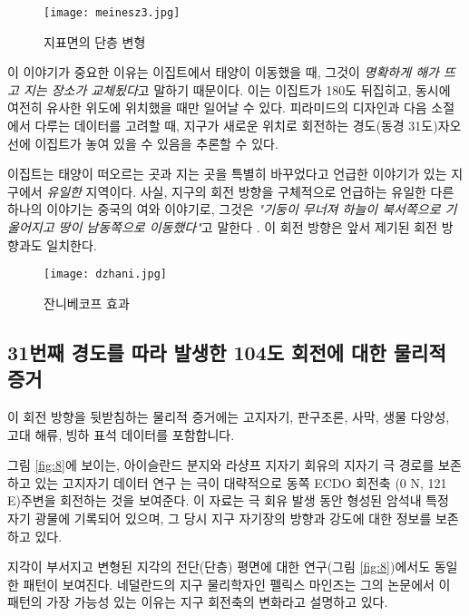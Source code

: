 \documentclass[10pt,twocolumn,letterpaper]{article}
\begin{document}
\begin{개요}
\begin{figure}[t]
\begin{center}
   \texttt{[image: meinesz3.jpg]}
\end{center}
   \caption{지표면의 단층 변형  \cite{36}}
\label{fig:8}
\label{fig:onecol}
\end{figure}


이 이야기가 중요한 이유는 이집트에서 태양이 이동했을 때, 그것이 \textit{ 명확하게 해가 뜨고 지는 장소가 교체됬다}고 말하기 때문이다. 이는 이집트가 180도 뒤집히고, 동시에 여전히 유사한 위도에 위치했을 때만 일어날 수 있다. 피라미드의 디자인과 다음 소절에서 다루는 데이터를 고려할 때, 지구가 새로운 위치로 회전하는 경도(동경 31도)자오선에 이집트가  놓여 있을 수 있음을 추론할 수 있다.

이집트는 태양이 떠오르는 곳과 지는 곳을 특별히 바꾸었다고 언급한 이야기가 있는 지구에서 \textit{유일한} 지역이다. 사실, 지구의 회전 방향을 구체적으로 언급하는 유일한 다른 하나의 이야기는 중국의 여와 이야기로, 그것은 \textit{"기둥이 무너져 하늘이 북서쪽으로 기울어지고 땅이 남동쪽으로 이동했다"}고 말한다 \cite{8}. 이 회전 방향은 앞서 제기된 회전 방향과도 일치한다.


\begin{figure*}[t]
\begin{center}
\texttt{[image: dzhani.jpg]}
\end{center}
   \caption{잔니베코프 효과  \cite{28}}
\label{fig:10}
\end{figure*}

\subsection{31번째 경도를 따라 발생한 104도 회전에 대한 물리적 증거}


이 회전 방향을 뒷받침하는 물리적 증거에는 고지자기, 판구조론, 사막, 생물 다양성, 고대 해류, 빙하 표석 데이터를 포함합니다.

그림 \ref{fig:8}에 보이는, 아이슬란드 분지와 라샹프 지자기 회유의 지자기 극 경로를 보존하고 있는 고지자기 데이터 연구 \cite{35}는 극이 대략적으로 동쪽 ECDO 회전축 (0 N, 121 E)주변을 회전하는 것을 보여준다. 이 자료는 극 회유 발생 동안 형성된 암석내 특정 자기 광물에 기록되어 있으며, 그 당시 지구 자기장의 방향과 강도에 대한 정보를 보존하고 있다.

지각이 부서지고 변형된 지각의 전단(단층) 평면에 대한 연구(그림 \ref{fig:8})에서도  동일한 패턴이 보여진다. 네덜란드의 지구 물리학자인 펠릭스 마인즈는 그의 논문에서 \cite{36} 이 패턴의 가장 가능성 있는 이유는 지구 회전축의 변화라고 설명하고 있다.


\end{개요}
\end{document}
